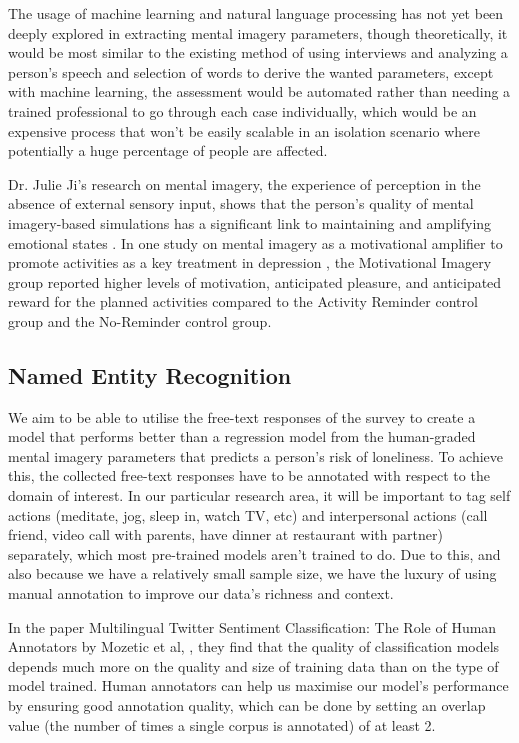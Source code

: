 \documentclass[12pt, a4paper]{article}
\begin{document}
The usage of machine learning and natural language processing has not yet been deeply explored in extracting mental imagery parameters, though theoretically, it would be most similar to the existing method of using interviews and analyzing a person's speech and selection of words to derive the wanted parameters, except with machine learning, the assessment would be automated rather than needing a trained professional to go through each case individually, which would be an expensive process that won't be easily scalable in an isolation scenario where potentially a huge percentage of people are affected.

Dr. Julie Ji's research on mental imagery, the experience of perception in the absence of external sensory input, shows that the person's quality of mental imagery-based simulations has a significant link to maintaining and amplifying emotional states \cite{conceptualandclinical}. In one study on mental imagery as a motivational amplifier to promote activities as a key treatment in depression \cite{motivationalamplifier}, the Motivational Imagery group reported higher levels of motivation, anticipated pleasure, and anticipated reward for the planned activities compared to the Activity Reminder control group and the No-Reminder control group.

\subsection{Named Entity Recognition}
We aim to be able to utilise the free-text responses of the survey to create a model that performs better than a regression model from the human-graded mental imagery parameters that predicts a person's risk of loneliness. To achieve this, the collected free-text responses have to be annotated with respect to the domain of interest. In our particular research area, it will be important to tag self actions (meditate, jog, sleep in, watch TV, etc) and interpersonal actions (call friend, video call with parents, have dinner at restaurant with partner) separately, which most pre-trained models aren't trained to do. Due to this, and also because we have a relatively small sample size, we have the luxury of using manual annotation to improve our data's richness and context.

In the paper Multilingual Twitter Sentiment Classification: The Role of Human Annotators by Mozetic et al, \cite{Mozeti__2016}, they find that the quality of classification models depends much more on the quality and size of training data than on the type of model trained. Human annotators can help us maximise our model's performance by ensuring good annotation quality, which can be done by setting an overlap value (the number of times a single corpus is annotated) of at least 2.
\end{document}
